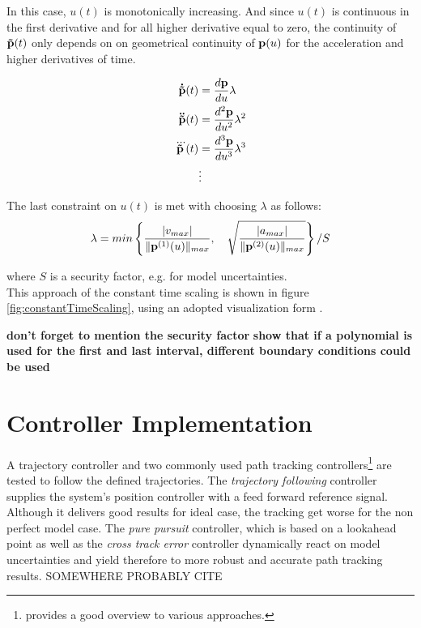 In this case, $u(t)$ is monotonically increasing. And since $u(t)$ is continuous in the first derivative and for all higher derivative equal to zero, the continuity of ${\bf \tilde{p}}(t)$ only depends on on geometrical continuity of ${\bf p}(u)$ for the acceleration and higher derivatives of time.

\begin{align}
{\bf \dot{\tilde{p}}}(t) &= \frac{d {\bf p}}{du}\lambda \\
{\bf \ddot{\tilde{p}}}(t) &= \frac{d^{2} {\bf p}}{du^{2}}\lambda^2 \\
{\bf \dddot{\tilde{p}}}(t) &= \frac{d^{3} {\bf p}}{du^{3}}\lambda^3 \\
&\vdots
\end{align}

The last constraint on $u(t)$ is met with choosing $\lambda$ as follows:
\begin{equation}
\lambda = min \left\{ \frac{|v_{max}|}{\|{\bf p}^{(1)}(u)\|_{max}}, \quad \sqrt{\frac{|a_{max}|}{\|{\bf p}^{(2)}(u)\|_{max}}}  \right\}/S
\end{equation}

where $S$ is a security factor, e.g. for model uncertainties.\\
This approach of the constant time scaling is shown in figure \ref{fig:constantTimeScaling}, using an adopted visualization form \cite{doessegger}.

{\bf don't forget to mention the security factor}
{\bf show that if a polynomial is used for the first and last interval, different boundary conditions could be used}

\section{Controller Implementation}
\label{sec:controllerImplementation}
A trajectory controller and two commonly used path tracking controllers\footnote{\cite{snider} provides a good overview to various approaches.} are tested to follow the defined trajectories. The \textit{trajectory following} controller supplies the system's position controller \cite{meiermueri} with a feed forward reference signal. Although it delivers good results for ideal case, the tracking get worse for the non perfect model case. The \textit{pure pursuit} controller, which is based on a lookahead point as well as the \textit{cross track error} controller dynamically react on model uncertainties and yield therefore to more robust and accurate path tracking results.
SOMEWHERE PROBABLY CITE \cite{deluca}
